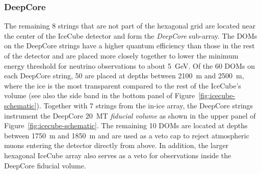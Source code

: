 \subsubsection{DeepCore}
The remaining 8 strings that are not part of the hexagonal grid are located near the center of the IceCube detector and form the \emph{DeepCore} sub-array.
The DOMs on the DeepCore strings have a higher quantum efficiency than those in the rest of the detector and are placed more closely together to lower the minimum energy threshold for neutrino observations to about 5~GeV. Of the 60 DOMs on each DeepCore string, 50 are placed at depths between 2100~m and 2500~m, where the ice is the most transparent compared to the rest of the IceCube's volume (see also the side band in the bottom panel of Figure~\ref{fig:icecube-schematic}). Together with 7 strings from the in-ice array, the DeepCore strings instrument the DeepCore 20~MT \emph{fiducial volume} as shown in the upper panel of Figure~\ref{fig:icecube-schematic}.
The remaining 10 DOMs are located at depths between 1750~m and 1850~m and are used as a veto cap to reject atmospheric muons entering the detector directly from above. In addition, the larger hexagonal IceCube array also serves as a veto for observations inside the DeepCore fiducial volume.
